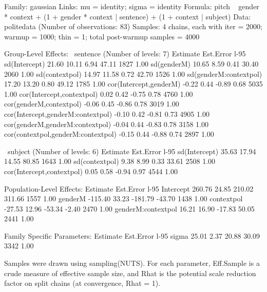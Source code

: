 \documentclass[nobib]{tufte-handout}
\begin{document}
\medskip

\begin{minipage}[]{1.5\textwidth}
\begin{rc}
 Family: gaussian 
  Links: mu = identity; sigma = identity 
Formula: pitch ~ gender * context + (1 + gender * context | sentence) + (1 + context | subject) 
   Data: politedata (Number of observations: 83) 
Samples: 4 chains, each with iter = 2000; warmup = 1000; thin = 1;
         total post-warmup samples = 4000

Group-Level Effects: 
~sentence (Number of levels: 7) 
                                   Estimate Est.Error l-95%
sd(Intercept)                         21.60     10.11     6.94    47.11       1827 1.00
sd(genderM)                           10.65      8.59     0.41    30.40       2060 1.00
sd(contextpol)                        14.97     11.58     0.72    42.70       1526 1.00
sd(genderM:contextpol)                17.20     13.20     0.80    49.12       1785 1.00
cor(Intercept,genderM)                -0.22      0.44    -0.89     0.68       5035 1.00
cor(Intercept,contextpol)              0.02      0.42    -0.75     0.78       4760 1.00
cor(genderM,contextpol)               -0.06      0.45    -0.86     0.78       3019 1.00
cor(Intercept,genderM:contextpol)     -0.10      0.42    -0.81     0.73       4905 1.00
cor(genderM,genderM:contextpol)       -0.04      0.44    -0.83     0.78       3158 1.00
cor(contextpol,genderM:contextpol)    -0.15      0.44    -0.88     0.74       2897 1.00

~subject (Number of levels: 6) 
                          Estimate Est.Error l-95%
sd(Intercept)                35.63     17.94    14.55    80.85       1643 1.00
sd(contextpol)                9.38      8.99     0.33    33.61       2508 1.00
cor(Intercept,contextpol)     0.05      0.58    -0.94     0.97       4544 1.00

Population-Level Effects: 
                   Estimate Est.Error l-95%
Intercept            260.76     24.85   210.02   311.66       1557 1.00
genderM             -115.40     33.23  -181.79   -43.70       1438 1.00
contextpol           -27.53     12.96   -53.34    -2.40       2470 1.00
genderM:contextpol    16.21     16.90   -17.83    50.05       2441 1.00

Family Specific Parameters: 
      Estimate Est.Error l-95%
sigma    25.01      2.37    20.88    30.09       3342 1.00

Samples were drawn using sampling(NUTS). For each parameter, Eff.Sample 
is a crude measure of effective sample size, and Rhat is the potential 
scale reduction factor on split chains (at convergence, Rhat = 1).
\end{rc}
\end{minipage}
\end{document}
